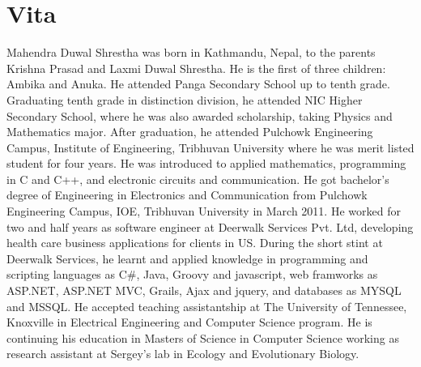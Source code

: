 \chapter*{Vita} \label{ch:vita}
Mahendra Duwal Shrestha was born in Kathmandu, Nepal, 
to the parents Krishna Prasad and Laxmi Duwal Shrestha. 
He is the first of three children: Ambika and Anuka. 
He attended Panga Secondary School up to tenth grade. 
Graduating tenth grade in distinction division, he attended 
NIC Higher Secondary School, where he was also awarded scholarship, taking Physics and Mathematics major. 
After graduation, he attended Pulchowk Engineering Campus, Institute of Engineering, Tribhuvan University 
where he was merit listed student for four years. He was introduced to applied mathematics, programming in 
C and C++, and electronic circuits and communication. 
He got bachelor's degree of Engineering in Electronics and Communication 
from Pulchowk Engineering Campus, IOE, Tribhuvan University in March 2011. 
He worked for two and half years as software engineer at Deerwalk Services Pvt. Ltd, 
developing health care business applications for clients in US. 
During the short stint at Deerwalk Services, he learnt and applied knowledge in programming and scripting languages as C#, 
Java, Groovy and javascript, web framworks as ASP.NET, ASP.NET MVC, Grails, Ajax and jquery, and databases as MYSQL and MSSQL. 
He accepted teaching assistantship at The University of Tennessee, Knoxville in Electrical Engineering and Computer Science 
program. He is continuing his education in Masters of Science in Computer Science working as research assistant at Sergey's lab 
in Ecology and Evolutionary Biology.
